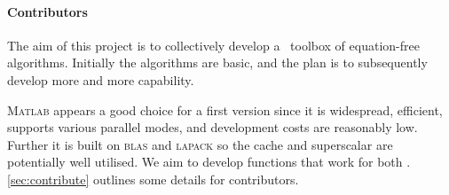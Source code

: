 \paragraph{Contributors}
The aim of this project is to collectively develop a \script\ toolbox of equation-free algorithms.
Initially the algorithms are basic, and the plan is to subsequently develop more and more capability.

\textsc{Matlab} appears a good choice for a first version since it is widespread, efficient, supports various parallel modes, and development costs are reasonably low.
Further it is built on \textsc{blas} and \textsc{lapack} so the cache and superscalar \cpu{} are potentially well utilised.
We aim to develop functions that work for both \script.
\cref{sec:contribute} outlines some details for contributors.


